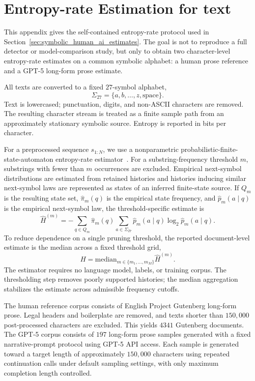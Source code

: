 \documentclass[
  aps,
  prresearch,
  reprint,
  amsmath,
  amssymb,
  superscriptaddress,
  nofootinbib,
  longbibliography
]{revtex4-2}
\begin{document}
\section{Entropy-rate Estimation for text}
\label{app:gutenberg_gpt5_entropy}

This appendix gives the self-contained entropy-rate protocol used in Section~\ref{sec:symbolic_human_ai_estimates}. The goal is not to reproduce a full detector or model-comparison study, but only to obtain two character-level entropy-rate estimates on a common symbolic alphabet: a human prose reference and a GPT-5 long-form prose estimate.

All texts are converted to a fixed \(27\)-symbol alphabet,
\[
    \Sigma_{27}=\{a,b,\ldots,z,\text{space}\}.
\]
Text is lowercased; punctuation, digits, and non-ASCII characters are removed. The resulting character stream is treated as a finite sample path from an approximately stationary symbolic source. Entropy is reported in bits per character.

For a preprocessed sequence \(s_{1:N}\), we use a nonparametric probabilistic-finite-state-automaton entropy-rate estimator~\citep{CLx,CL12g}. For a substring-frequency threshold \(m\), substrings with fewer than \(m\) occurrences are excluded. Empirical next-symbol distributions are estimated from retained histories and histories inducing similar next-symbol laws are represented as states of an inferred finite-state source. If \(Q_m\) is the resulting state set, \(\widehat\pi_m(q)\) is the empirical state frequency, and \(\widehat p_m(a\mid q)\) is the empirical next-symbol law, the threshold-specific estimate is
\begin{equation}
    \widehat H^{(m)}
    =
    -\sum_{q\in Q_m}\widehat\pi_m(q)
      \sum_{a\in\Sigma_{27}}
      \widehat p_m(a\mid q)\log_2\widehat p_m(a\mid q).
\end{equation}
To reduce dependence on a single pruning threshold, the reported document-level estimate is the median across a fixed threshold grid,
\begin{equation}
    \widehat H
    =
    \mathrm{median}_{m\in\{m_1,\ldots,m_M\}}
    \widehat H^{(m)}.
\end{equation}
The estimator requires no language model, labels, or training corpus. The thresholding step removes poorly supported histories; the median aggregation stabilizes the estimate across admissible frequency cutoffs.

The human reference corpus consists of English Project Gutenberg long-form prose. Legal headers and boilerplate are removed, and texts shorter than \(150{,}000\) post-processed characters are excluded. This yields \(4341\) Gutenberg documents. The GPT-5 corpus consists of \(197\) long-form prose samples generated with a fixed narrative-prompt protocol using GPT-5 API access. Each sample is generated toward a target length of approximately \(150{,}000\) characters using repeated continuation calls under default sampling settings, with only maximum completion length controlled.
\end{document}
